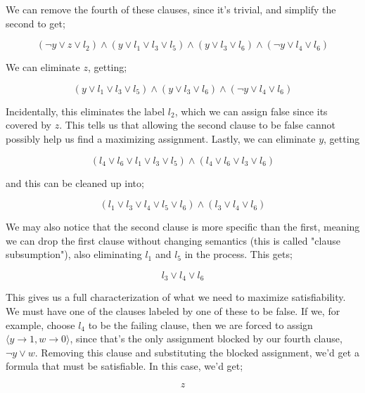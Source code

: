 We can remove the fourth of these clauses, since it's trivial, and simplify the second to get;

\begin{equation}
(\neg y\lor z\lor l_2)\land (y\lor l_1 \lor l_3\lor l_5)\land (y\lor l_3\lor l_6) \land (\neg y\lor l_4\lor l_6)
\end{equation}

We can eliminate $z$, getting;

\begin{equation}
(y\lor l_1 \lor l_3\lor l_5)\land (y\lor l_3\lor l_6) \land (\neg y\lor l_4\lor l_6)
\end{equation}

Incidentally, this eliminates the label $l_2$, which we can assign false since its covered by $z$. This tells us that allowing the second clause to be false cannot possibly help us find a maximizing assignment. Lastly, we can eliminate $y$, getting

\begin{equation}
    (l_4 \lor l_6\lor l_1\lor l_3\lor l_5)\land (l_4\lor l_6\lor l_3\lor l_6)
\end{equation}

and this can be cleaned up into;

\begin{equation}
    (l_1 \lor l_3\lor l_4\lor l_5\lor l_6)\land (l_3 \lor l_4\lor l_6)
\end{equation}

We may also notice that the second clause is more specific than the first, meaning we can drop the first clause without changing semantics (this is called "clause subsumption"), also eliminating $l_1$ and $l_5$ in the process. This gets;

\begin{equation}
    l_3 \lor l_4\lor l_6
\end{equation}

This gives us a full characterization of what we need to maximize satisfiability. We must have one of the clauses labeled by one of these to be false. If we, for example, choose $l_4$ to be the failing clause, then we are forced to assign $\langle y \rightarrow 1, w \rightarrow 0\rangle$, since that's the only assignment blocked by our fourth clause, $\neg y \vee w$. Removing this clause and substituting the blocked assignment, we'd get a formula that must be satisfiable. In this case, we'd get;

\begin{equation}
    z
\end{equation}

